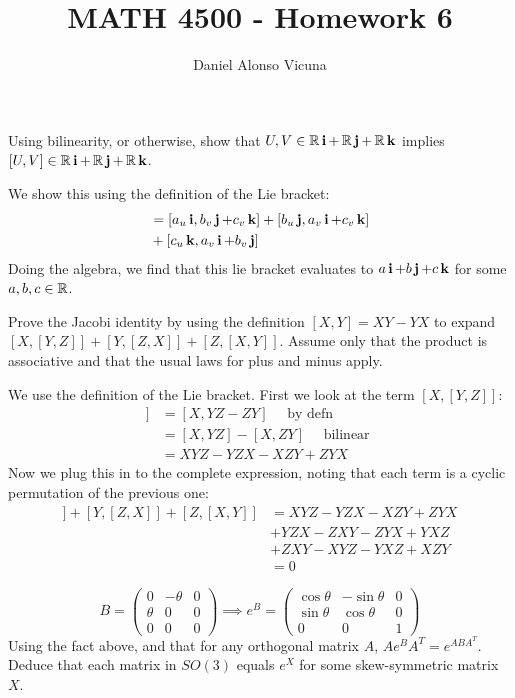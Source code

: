 \documentclass[12pt,onecolumn]{article}
\title{MATH 4500 - Homework 6}
\author{Daniel Alonso Vicuna}
\begin{document}
\maketitle

\begin{exercise}
Using bilinearity, or otherwise, show that $U,V \in \operatorname{\mathbb{R}} \operatorname{\textbf{i}}+ \operatorname{\mathbb{R}} \operatorname{\textbf{j}}+ \operatorname{\mathbb{R}} \operatorname{\textbf{k}}$ implies $[U,V] \in  \operatorname{\mathbb{R}} \operatorname{\textbf{i}}+ \operatorname{\mathbb{R}} \operatorname{\textbf{j}}+ \operatorname{\mathbb{R}} \operatorname{\textbf{k}}$.
\end{exercise}
\begin{answer}
We show this using the definition of the Lie bracket:
\begin{align*}
    [a_u\ii+b_u\jj+c_u\kk,a_v\ii+b_v\jj+c_v\kk] &= [a_u\ii,b_v\jj+c_v\kk]+[b_u\jj,a_v\ii+c_v\kk]\\
    &+ [c_u\kk,a_v\ii+b_v\jj]
\end{align*}
Doing the algebra, we find that this lie bracket evaluates to $a\operatorname{\textbf{i}} + b\operatorname{\textbf{j}}+c\operatorname{\textbf{k}}$ for some $a,b,c\in \operatorname{\mathbb{R}}$.
\end{answer}
\begin{exercise}
Prove the Jacobi identity by using the deﬁnition $[X,Y]=XY-YX$ to expand $[X,[Y,Z]]+[Y,[Z,X]]+[Z,[X,Y]]$. Assume only that the product is associative and that the usual laws for plus and minus apply. 
\end{exercise}
\begin{answer}
We use the definition of the Lie bracket. First we look at the term $[X,[Y,Z]]$:
\begin{align*}
    [X,[Y,Z]] &= [X,YZ - ZY] \quad \text{ by defn } \\
    &= [X,YZ] - [X,ZY] \quad \text{ bilinear } \\
    &= XYZ - YZX - XZY + ZYX
\end{align*}
Now we plug this in to the complete expression, noting that each term is a cyclic permutation of the previous one:
\begin{align*}
    [X,[Y,Z]]+[Y,[Z,X]]+[Z,[X,Y]] &= XYZ - YZX - XZY + ZYX \\
    &+ YZX - ZXY - ZYX + YXZ \\
    &+ ZXY - XYZ - YXZ + XZY \\
    &= 0
\end{align*}
\end{answer}
\begin{exercise}
$$ B = \begin{pmatrix} 0 & -\theta & 0 \\ \theta & 0 & 0 \\ 0 & 0 & 0 \end{pmatrix} \implies e^B = \begin{pmatrix} \cos{\theta} & -\sin{\theta} & 0 \\ \sin{\theta} & \cos{\theta} & 0 \\ 0 & 0 & 1 \end{pmatrix}  $$
Using the fact above, and that for any orthogonal matrix $A$,  $Ae^{B}A^T =e^{ABA^T}$. Deduce that each matrix in $SO(3)$ equals $e^X$ for some skew-symmetric matrix $X$.
\end{exercise}
\end{document}

